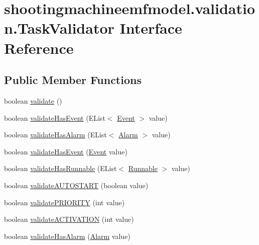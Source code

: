 \hypertarget{interfaceshootingmachineemfmodel_1_1validation_1_1_task_validator}{\section{shootingmachineemfmodel.\-validation.\-Task\-Validator Interface Reference}
\label{interfaceshootingmachineemfmodel_1_1validation_1_1_task_validator}
}
\subsection*{Public Member Functions}
\begin{DoxyCompactItemize}
\item 
boolean \hyperlink{interfaceshootingmachineemfmodel_1_1validation_1_1_task_validator_a48d99bf493986f1d794e12fda41f1c82}{validate} ()
\item 
boolean \hyperlink{interfaceshootingmachineemfmodel_1_1validation_1_1_task_validator_a95c30c92dfa95e7a81d25df263b4b5b0}{validate\-Has\-Event} (E\-List$<$ \hyperlink{interfaceshootingmachineemfmodel_1_1_event}{Event} $>$ value)
\item 
boolean \hyperlink{interfaceshootingmachineemfmodel_1_1validation_1_1_task_validator_afe7fffa55266f3eb01ee362d6e588fe4}{validate\-Has\-Alarm} (E\-List$<$ \hyperlink{interfaceshootingmachineemfmodel_1_1_alarm}{Alarm} $>$ value)
\item 
boolean \hyperlink{interfaceshootingmachineemfmodel_1_1validation_1_1_task_validator_ab40984896045aa6c3e3b7f2e6ddffcaf}{validate\-Has\-Event} (\hyperlink{interfaceshootingmachineemfmodel_1_1_event}{Event} value)
\item 
boolean \hyperlink{interfaceshootingmachineemfmodel_1_1validation_1_1_task_validator_ac59b7818fc3f74fbcbf36a6932b35cfd}{validate\-Has\-Runnable} (E\-List$<$ \hyperlink{interfaceshootingmachineemfmodel_1_1_runnable}{Runnable} $>$ value)
\item 
boolean \hyperlink{interfaceshootingmachineemfmodel_1_1validation_1_1_task_validator_adcecb2911f1e6ced388020523380468d}{validate\-A\-U\-T\-O\-S\-T\-A\-R\-T} (boolean value)
\item 
boolean \hyperlink{interfaceshootingmachineemfmodel_1_1validation_1_1_task_validator_a767d4d1176a0bf952e05eb8d186da575}{validate\-P\-R\-I\-O\-R\-I\-T\-Y} (int value)
\item 
boolean \hyperlink{interfaceshootingmachineemfmodel_1_1validation_1_1_task_validator_a87d6b64b33a4aca495e713fefde80638}{validate\-A\-C\-T\-I\-V\-A\-T\-I\-O\-N} (int value)
\item 
boolean \hyperlink{interfaceshootingmachineemfmodel_1_1validation_1_1_task_validator_aeed3b679b5fb32ae0b0ee70ac3883f33}{validate\-Has\-Alarm} (\hyperlink{interfaceshootingmachineemfmodel_1_1_alarm}{Alarm} value)
\end{DoxyCompactItemize}


